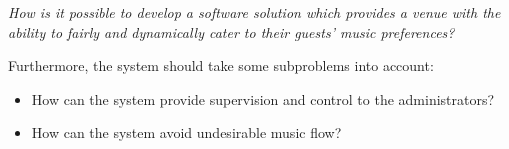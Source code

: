 \begin{center}
\textit{How is it possible to develop a software solution which provides a venue with the ability to fairly and dynamically cater to their guests' music preferences?}
\end{center}

Furthermore, the system should take some subproblems into account:
\begin{itemize}
\item How can the system provide supervision and control to the administrators?
\item How can the system avoid undesirable music flow?
\end{itemize}